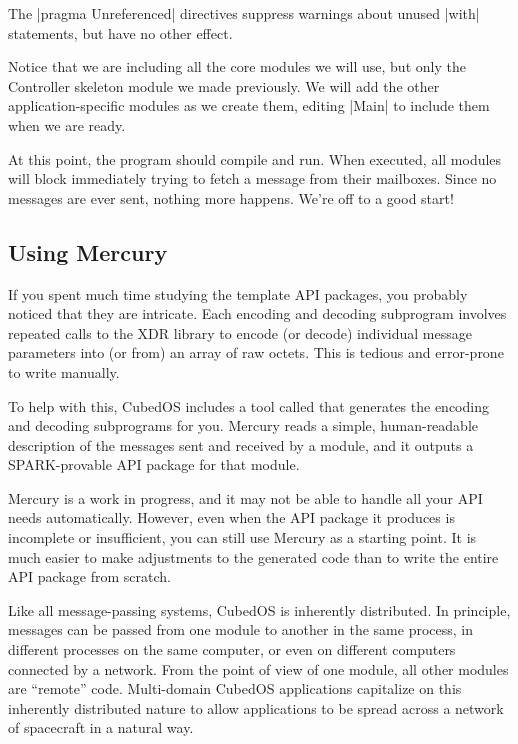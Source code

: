 The |pragma Unreferenced| directives suppress warnings about unused |with| statements, but have
no other effect.

Notice that we are including all the core modules we will use, but only the Controller
skeleton module we made previously. We will add the other application-specific modules as we
create them, editing |Main| to include them when we are ready.

At this point, the program should compile and run. When executed, all modules will block
immediately trying to fetch a message from their mailboxes. Since no messages are ever sent,
nothing more happens. We're off to a good start!

\subsection{Using Mercury}
\label{sec:manual-tutorial-mercury}

If you spent much time studying the template API packages, you probably noticed that they are
intricate. Each encoding and decoding subprogram involves repeated calls to the XDR library to
encode (or decode) individual message parameters into (or from) an array of raw octets. This is
tedious and error-prone to write manually.

To help with this, CubedOS includes a tool called  that generates the encoding
and decoding subprograms for you. Mercury reads a simple, human-readable description of the
messages sent and received by a module, and it outputs a SPARK-provable API package for that
module.

Mercury is a work in progress, and it may not be able to handle all your API needs
automatically. However, even when the API package it produces is incomplete or insufficient, you
can still use Mercury as a starting point. It is much easier to make adjustments to the
generated code than to write the entire API package from scratch.

Like all message-passing systems, CubedOS is inherently distributed. In principle, messages can
be passed from one module to another in the same process, in different processes on the same
computer, or even on different computers connected by a network. From the point of view of one
module, all other modules are ``remote'' code. Multi-domain CubedOS applications capitalize on
this inherently distributed nature to allow applications to be spread across a network of
spacecraft in a natural way.

